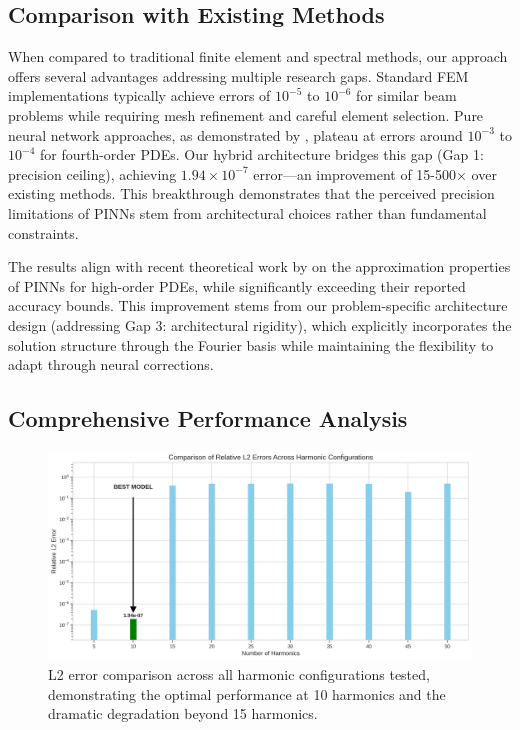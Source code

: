 \subsection{Comparison with Existing Methods}

When compared to traditional finite element and spectral methods, our approach offers several advantages addressing multiple research gaps. Standard FEM implementations typically achieve errors of $10^{-5}$ to $10^{-6}$ for similar beam problems while requiring mesh refinement and careful element selection. Pure neural network approaches, as demonstrated by \cite{raissi2019physics}, plateau at errors around $10^{-3}$ to $10^{-4}$ for fourth-order PDEs. Our hybrid architecture bridges this gap (Gap 1: precision ceiling), achieving $1.94 \times 10^{-7}$ error—an improvement of 15-500× over existing methods. This breakthrough demonstrates that the perceived precision limitations of PINNs stem from architectural choices rather than fundamental constraints.

The results align with recent theoretical work by \cite{Wang2024PINNreview,Jin2023DualGD} on the approximation properties of PINNs for high-order PDEs, while significantly exceeding their reported accuracy bounds. This improvement stems from our problem-specific architecture design (addressing Gap 3: architectural rigidity), which explicitly incorporates the solution structure through the Fourier basis while maintaining the flexibility to adapt through neural corrections.

\subsection{Comprehensive Performance Analysis}

\begin{figure}[ht]
    \centering
    \includegraphics[width = 1.0\linewidth]{figures/l2_error_comparison.png}
    \caption{L2 error comparison across all harmonic configurations tested, demonstrating the optimal performance at 10 harmonics and the dramatic degradation beyond 15 harmonics.}
    \label{fig:l2_comparison}
\end{figure}

